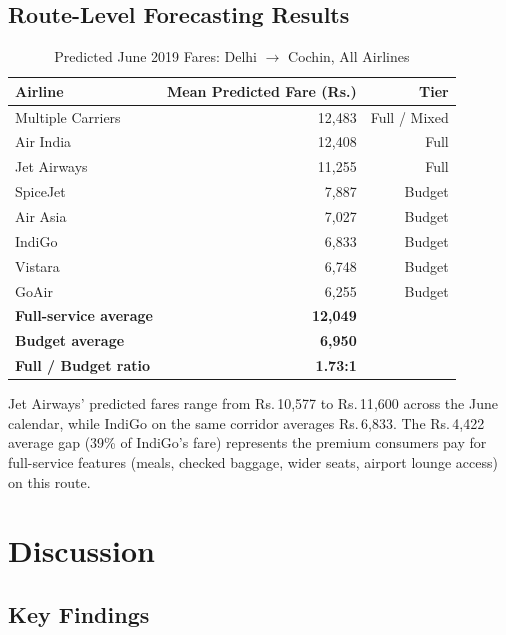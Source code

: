 \documentclass[12pt, a4paper]{article}
\begin{document}
\subsection{Route-Level Forecasting Results}

\begin{table}[h]
\caption{Predicted June 2019 Fares: Delhi $\rightarrow$ Cochin, All Airlines}
\label{tab:del_cok}
\centering
\begin{tabular}{lrr}
\toprule
\textbf{Airline} & \textbf{Mean Predicted Fare (Rs.)} & \textbf{Tier} \\
\midrule
Multiple Carriers & 12{,}483 & Full / Mixed \\
Air India         & 12{,}408 & Full \\
Jet Airways       & 11{,}255 & Full \\
SpiceJet          &  7{,}887 & Budget \\
Air Asia          &  7{,}027 & Budget \\
IndiGo            &  6{,}833 & Budget \\
Vistara           &  6{,}748 & Budget \\
GoAir             &  6{,}255 & Budget \\
\midrule
\textbf{Full-service average} & \textbf{12{,}049} & \\
\textbf{Budget average}       & \textbf{6{,}950}  & \\
\textbf{Full / Budget ratio}  & \textbf{1.73:1}   & \\
\bottomrule
\end{tabular}
\end{table}

Jet Airways' predicted fares range from Rs.\,10{,}577 to Rs.\,11{,}600
across the June calendar, while IndiGo on the same corridor averages
Rs.\,6{,}833.  The Rs.\,4{,}422 average gap (39\% of IndiGo's fare)
represents the premium consumers pay for full-service features (meals,
checked baggage, wider seats, airport lounge access) on this route.

\section{Discussion}
\label{sec:discussion}

\subsection{Key Findings}
\end{document}

